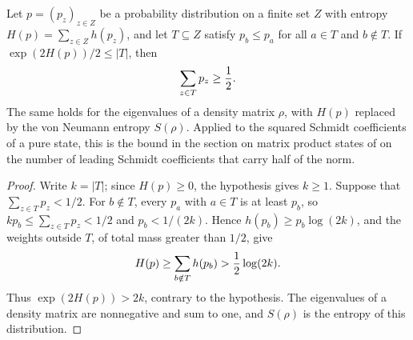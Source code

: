 \begin{lemma}
    \label{lem:leading_weights_of_bounded_entropy}
    \leanok
    Let $p=(p_z)_{z\in Z}$ be a probability distribution on a finite set $Z$
    with entropy $H(p)=\sum_{z\in Z}h(p_z)$, and let $T\subseteq Z$ satisfy
    $p_b\leq p_a$ for all $a\in T$ and $b\notin T$. If
    $\exp(2H(p))/2\leq\lvert T\rvert$, then
    \begin{align}
        \sum_{z\in T}p_z\geq\frac{1}{2}.
        \notag
    \end{align}
    The same holds for the eigenvalues of a density matrix $\rho$, with $H(p)$
    replaced by the von Neumann entropy $S(\rho)$. Applied to the squared
    Schmidt coefficients of a pure state, this is the bound in the section
    on matrix product states of \cite{Hastings2007AreaLaw} on the number of
    leading Schmidt coefficients that carry half of the norm.
\end{lemma}
\begin{proof}\leanok
    Write $k=\lvert T\rvert$; since $H(p)\geq0$, the hypothesis gives
    $k\geq1$. Suppose that $\sum_{z\in T}p_z<1/2$. For $b\notin T$, every
    $p_a$ with $a\in T$ is at least $p_b$, so $kp_b\leq\sum_{z\in T}p_z<1/2$
    and $p_b<1/(2k)$. Hence $h(p_b)\geq p_b\log(2k)$, and the weights outside
    $T$, of total mass greater than $1/2$, give
    \begin{align}
        H(p)\geq\sum_{b\notin T}h(p_b)>\frac{1}{2}\log(2k).
        \notag
    \end{align}
    Thus $\exp(2H(p))>2k$, contrary to the hypothesis. The eigenvalues of a
    density matrix are nonnegative and sum to one, and $S(\rho)$ is the
    entropy of this distribution.
\end{proof}

